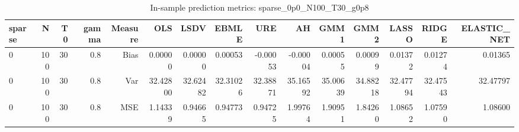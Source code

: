 \begin{table}[!htbp]\centering
\caption{In-sample prediction metrics: sparse_0p0_N100_T30_g0p8}
\label{tab:table2_sparse_0p0_N100_T30_g0p8}
\begin{tabular}{lrrrrrrrrrrrrrr}
\hline
sparse & N & T0 & gamma & Measure & OLS & LSDV & EBMLE & URE & AH & GMM1 & GMM2 & LASSO & RIDGE & ELASTIC_NET \\
\hline
0 & 100 & 30 & 0.8 & Bias & 0.00000 & 0.00000 & 0.00053 & -0.00053 & -0.00004 & 0.00055 & 0.00099 & 0.01372 & 0.01274 & 0.01365 \\
0 & 100 & 30 & 0.8 & Var & 32.42800 & 32.62482 & 32.31026 & 32.38871 & 35.16592 & 35.00639 & 34.88218 & 32.47794 & 32.47543 & 32.47797 \\
0 & 100 & 30 & 0.8 & MSE & 1.14339 & 0.94665 & 0.94773 & 0.94725 & 1.99764 & 1.90951 & 1.84260 & 1.08652 & 1.07590 & 1.08600 \\
\hline
\end{tabular}
\end{table}

